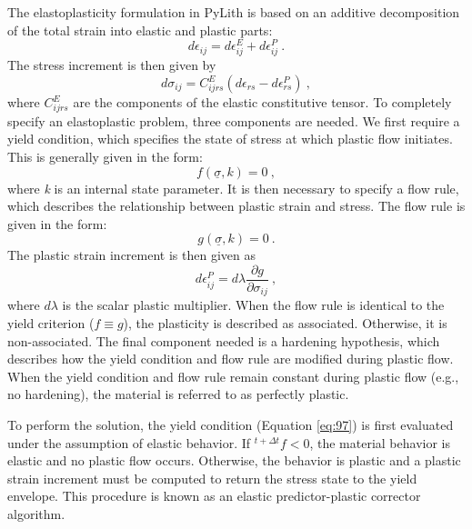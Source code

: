 The elastoplasticity formulation in PyLith is based on an additive
decomposition of the total strain into elastic and plastic parts:
\begin{equation}
d\epsilon_{ij}=d\epsilon_{ij}^{E}+d\epsilon_{ij}^{P}\:.\label{eq:95}
\end{equation}
The stress increment is then given by
\begin{equation}
d\sigma_{ij}=C_{ijrs}^{E}\left(d\epsilon_{rs}-d\epsilon_{rs}^{P}\right)\:,\label{eq:96}
\end{equation}
where $C_{ijrs}^{E}$ are the components of the elastic constitutive
tensor. To completely specify an elastoplastic problem, three components
are needed. We first require a yield condition, which specifies the
state of stress at which plastic flow initiates. This is generally
given in the form:
\begin{equation}
f\left(\underline{\sigma},k\right)=0\:,\label{eq:97}
\end{equation}
where \textit{k} is an internal state parameter. It is then necessary
to specify a flow rule, which describes the relationship between plastic
strain and stress. The flow rule is given in the form:
\begin{equation}
g\left(\underline{\sigma},k\right)=0\:.\label{eq:98}
\end{equation}
The plastic strain increment is then given as
\begin{equation}
d\epsilon_{ij}^{P}=d\lambda\frac{\partial g}{\partial\sigma_{ij}}\:,\label{eq:99}
\end{equation}
where $d\lambda$ is the scalar plastic multiplier. When the flow
rule is identical to the yield criterion ($f\equiv g$), the plasticity
is described as associated. Otherwise, it is non-associated. The final
component needed is a hardening hypothesis, which describes how the
yield condition and flow rule are modified during plastic flow. When
the yield condition and flow rule remain constant during plastic flow
(e.g., no hardening), the material is referred to as perfectly plastic.

To perform the solution, the yield condition (Equation \vref{eq:97})
is first evaluated under the assumption of elastic behavior. If $^{t+\Delta t}f<0$,
the material behavior is elastic and no plastic flow occurs. Otherwise,
the behavior is plastic and a plastic strain increment must be computed
to return the stress state to the yield envelope. This procedure is
known as an elastic predictor-plastic corrector algorithm.



